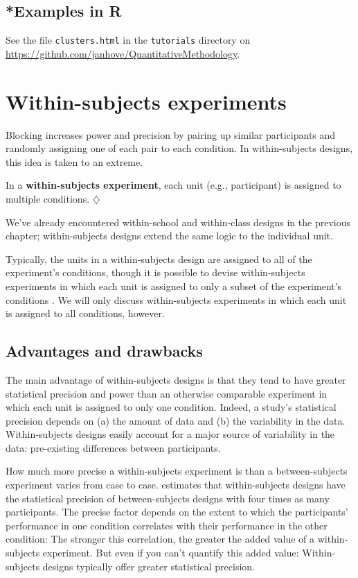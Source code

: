 \documentclass[a4paper]{tufte-book}\usepackage[]{graphicx}\usepackage[]{xcolor}
\newcommand{\term}[1]{\textbf{#1}}
\newcommand*{\parend}[1][$\diamondsuit$]{%
  \unskip\nobreak\hspace{1em plus 1fill}$\diamondsuit$%
}
\begin{document}
\section{*Examples in R}
See the file \texttt{clusters.html}
in the \texttt{tutorials} directory on \url{https://github.com/janhove/QuantitativeMethodology}.


\chapter{Within-subjects experiments}
Blocking increases power and precision by
pairing up similar participants and randomly assigning one of each pair to
each condition. In within-subjects designs, this idea is taken to an extreme.

  In a \term{within-subjects experiment}, each unit (e.g., participant)
  is assigned to multiple conditions.
\parend

We've already encountered within-school and within-class designs
in the previous chapter;
within-subjects designs extend the same logic to the individual unit.

Typically, the units in a within-subjects design are assigned to all
of the experiment's conditions, though it is possible to devise
within-subjects experiments in which each unit is assigned to
only a subset of the experiment's conditions
\citep[see][Section 7.3]{Senn2002}.
We will only discuss within-subjects experiments in which 
each unit is assigned to all conditions, however.

\section{Advantages and drawbacks}
The main advantage of within-subjects designs is 
that they tend to have greater statistical precision and power than an otherwise
comparable experiment in which each unit is assigned to only one condition.
Indeed, a study's statistical precision depends on
 (a) the amount of data and
 (b) the variability in the data. 
Within-subjects designs easily account for a major source of variability in the data:
pre-existing differences between participants.
 
How much more precise a within-subjects experiment is than a
between-subjects experiment varies from case to case.
\citet{Quene2010} 
estimates that within-subjects designs have the statistical precision
of between-subjects designs with four times as many participants.
The precise factor depends on the extent to which the participants'
performance in one condition correlates with their performance in the
other condition:
The stronger this correlation, the greater the added value of a
within-subjects experiment.
But even if you can't quantify this added value: 
Within-subjects designs typically offer greater statistical precision.
 
\end{document}
